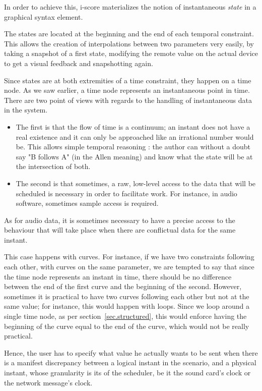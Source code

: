 \documentclass{sigchi}
\begin{document}
In order to achieve this, i-score materializes the notion of instantaneous \textit{state} in a graphical syntax element.

The states are located at the beginning and the end of each temporal constraint. This allows the creation of interpolations between two parameters very easily, by taking a snapshot of a first state, modifying the remote value on the actual device to get a visual feedback and snapshotting again. 

Since states are at both extremities of a time constraint, they happen on a time node. As we saw earlier, a time node represents an instantaneous point in time. 
There are two point of views with regards to the handling of instantaneous data in the system.

\begin{itemize}
	\item The first is that the flow of time is a continuum; an instant does not have a real existence and it can only be approached like an irrational number would be.
	This allows simple temporal reasoning : the author can without a doubt say "B follows A" (in the Allen meaning) and know what the state will be at the intersection of both.
	\item The second is that sometimes, a raw, low-level access to the data that will be scheduled is necessary in order to facilitate work. For instance, in audio software, sometimes sample access is required.   
\end{itemize}
As for audio data, it is sometimes necessary to have a precise access to the behaviour that will take place when there are conflictual data for the same instant. %

This case happens with curves. For instance, if we have two constraints following each other, with curves on the same parameter, we are tempted to say that since the time node represents an instant in time, there should be no difference between the end of the first curve and the beginning of the second. However, sometimes it is practical to have two curves following each other but not at the same value; for instance, this would happen with loops. Since we loop around a single time node, as per section~\ref{sec.structured}, this would enforce having the beginning of the curve equal to the end of the curve, which would not be really practical.

Hence, the user has to specify what value he actually wants to be sent when there is a manifest discrepancy between a logical instant in the scenario, and a physical instant, whose granularity is its of the scheduler, be it the sound card's clock or the network message's clock.
\end{document}
